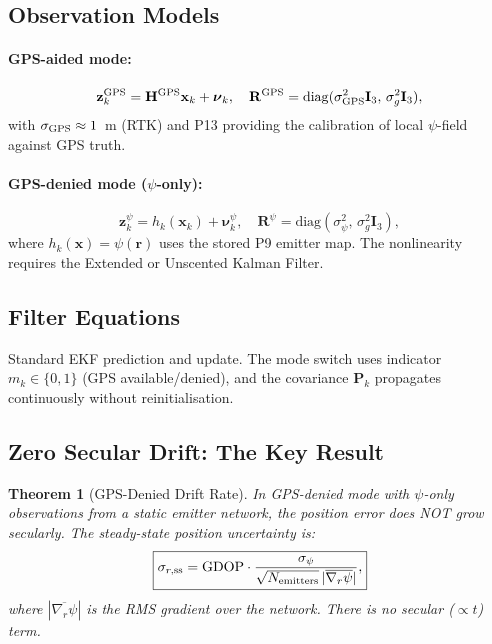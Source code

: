 \documentclass[aps,prd,twocolumn,superscriptaddress,nofootinbib]{revtex4-2}
\newtheorem{theorem}{Theorem}
\begin{document}
\subsection{Observation Models}

\paragraph{GPS-aided mode:}
\begin{equation}
\mathbf{z}_k^{\rm GPS} = \mathbf{H}^{\rm GPS}\mathbf{x}_k + \boldsymbol{\nu}_k,\quad
\mathbf{R}^{\rm GPS} = \mathrm{diag}(\sigma_{\rm GPS}^2\mathbf{I}_3,\, \sigma_g^2\mathbf{I}_3),
\label{eq:obs-gps}
\end{equation}
with $\sigma_{\rm GPS} \approx 1$~m (RTK) and P13 providing the calibration
of local $\psi$-field against GPS truth.

\paragraph{GPS-denied mode ($\psi$-only):}
\begin{equation}
\mathbf{z}_k^\psi = h_k(\mathbf{x}_k) + \boldsymbol{\nu}_k^\psi,\quad
\mathbf{R}^\psi = \mathrm{diag}(\sigma_\psi^2,\, \sigma_g^2\mathbf{I}_3),
\label{eq:obs-psi}
\end{equation}
where $h_k(\mathbf{x}) = \psi(\mathbf{r})$ uses the stored P9 emitter map.
The nonlinearity requires the Extended or Unscented Kalman Filter.

\subsection{Filter Equations}

Standard EKF prediction and update.  The mode switch uses indicator
$m_k \in \{0,1\}$ (GPS available/denied), and the covariance
$\mathbf{P}_k$ propagates continuously without reinitialisation.

\subsection{Zero Secular Drift: The Key Result}

\begin{theorem}[GPS-Denied Drift Rate]
\label{thm:drift}
In GPS-denied mode with $\psi$-only observations from a static emitter
network, the position error does NOT grow secularly.  The steady-state
position uncertainty is:
\begin{equation}
\boxed{
\sigma_{r,\rm ss} = \mathrm{GDOP}\cdot
\frac{\sigma_\psi}{\sqrt{N_{\rm emitters}}\,|\overline{\nabla_r\psi}|},
}
\label{eq:ss-error}
\end{equation}
where $|\overline{\nabla_r\psi}|$ is the RMS gradient over the network.
There is no secular ($\propto t$) term.
\end{theorem}
\end{document}
